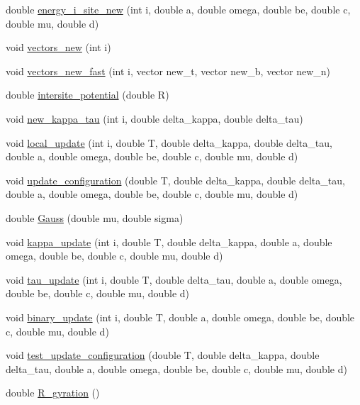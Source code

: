 \begin{DoxyCompactItemize}
\item 
double \hyperlink{classpolymer_a47c7d5b3032498f761d5ff4c6f6bd84a}{energy\+\_\+i\+\_\+site\+\_\+new} (int i, double a, double omega, double be, double c, double mu, double d)
\item 
void \hyperlink{classpolymer_a9c3aef8cf024d559254771d849edf0ee}{vectors\+\_\+new} (int i)
\item 
void \hyperlink{classpolymer_a7cdc581f953eb562e1ca66743b943066}{vectors\+\_\+new\+\_\+fast} (int i, vector new\+\_\+t, vector new\+\_\+b, vector new\+\_\+n)
\item 
double \hyperlink{classpolymer_a1409622014bc93fe524b0f44570a36fa}{intersite\+\_\+potential} (double R)
\item 
void \hyperlink{classpolymer_a63d6473a8c68d6da59673005f9b7db53}{new\+\_\+kappa\+\_\+tau} (int i, double delta\+\_\+kappa, double delta\+\_\+tau)
\item 
void \hyperlink{classpolymer_a7839c7cba47dbbfadedb6890d13970d1}{local\+\_\+update} (int i, double T, double delta\+\_\+kappa, double delta\+\_\+tau, double a, double omega, double be, double c, double mu, double d)
\item 
void \hyperlink{classpolymer_a32064d363a3e98475d1ae4733b214160}{update\+\_\+configuration} (double T, double delta\+\_\+kappa, double delta\+\_\+tau, double a, double omega, double be, double c, double mu, double d)
\item 
double \hyperlink{classpolymer_ab3fd4640505e410cc7bc24fe8c981fc5}{Gauss} (double mu, double sigma)
\item 
void \hyperlink{classpolymer_a09ba10cc653467a268ab0ba8e04f930b}{kappa\+\_\+update} (int i, double T, double delta\+\_\+kappa, double a, double omega, double be, double c, double mu, double d)
\item 
void \hyperlink{classpolymer_af95590e5cd7bfc6b5739b60d6e95bc5e}{tau\+\_\+update} (int i, double T, double delta\+\_\+tau, double a, double omega, double be, double c, double mu, double d)
\item 
void \hyperlink{classpolymer_a67677c98489a609df49e94a457672beb}{binary\+\_\+update} (int i, double T, double a, double omega, double be, double c, double mu, double d)
\item 
void \hyperlink{classpolymer_a919bef5d8c1c121e48a0cb3fb389dfad}{test\+\_\+update\+\_\+configuration} (double T, double delta\+\_\+kappa, double delta\+\_\+tau, double a, double omega, double be, double c, double mu, double d)
\item 
double \hyperlink{classpolymer_aea38306aefc9608092464ae7f402a2d7}{R\+\_\+gyration} ()
\end{DoxyCompactItemize}
